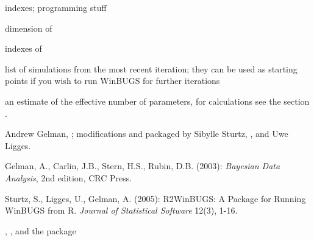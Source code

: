 \begin{Value}
\begin{ldescription}
\item[\code{long.short}] indexes; programming stuff
\item[\code{dimension.short}] dimension of 
\item[\code{indexes.short}] indexes of 
\item[\code{last.values}] list of simulations from the most recent iteration; they
can be used as starting points if you wish to run WinBUGS for further iterations
\item[\code{pD}] an estimate of the effective number of parameters, for calculations see the section .
\item[\code{DIC}] 
\end{ldescription}
\end{Value}
\begin{Author}\relax
Andrew Gelman, ;
modifications and packaged by Sibylle Sturtz, , and Uwe Ligges.
\end{Author}
\begin{References}\relax
Gelman, A., Carlin, J.B., Stern, H.S., Rubin, D.B. (2003):
\emph{Bayesian Data Analysis}, 2nd edition, CRC Press.

Sturtz, S., Ligges, U., Gelman, A. (2005):
R2WinBUGS: A Package for Running WinBUGS from R.
\emph{Journal of Statistical Software} 12(3), 1-16.
\end{References}
\begin{SeeAlso}\relax
{}, , and the  package
\end{SeeAlso}

